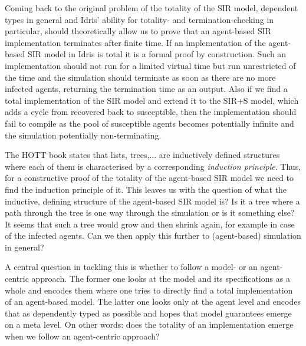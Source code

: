 Coming back to the original problem of the totality of the SIR model, dependent types in general and Idris' ability for totality- and termination-checking in particular, should theoretically allow us to prove that an agent-based SIR implementation terminates after finite time. If an implementation of the agent-based SIR model in Idris is total it is a formal proof by construction. Such an implementation should not run for a limited virtual time but run unrestricted of the time and the simulation should terminate as soon as there are no more infected agents, returning the termination time as an output. Also if we find a total implementation of the SIR model and extend it to the SIR+S model, which adds a cycle from recovered back to susceptible, then the implementation should fail to compile as the pool of susceptible agents becomes potentially infinite and the simulation potentially non-terminating.

The HOTT book \cite{program_homotopy_2013} states that lists, trees,... are inductively defined structures where each of them is characterised by a corresponding \textit{induction principle}. Thus, for a constructive proof of the totality of the agent-based SIR model we need to find the induction principle of it. This leaves us with the question of what the inductive, defining structure of the agent-based SIR model is? Is it a tree where a path through the tree is one way through the simulation or is it something else? It seems that such a tree would grow and then shrink again, for example in case of the infected agents. Can we then apply this further to (agent-based) simulation in general?

A central question in tackling this is whether to follow a model- or an agent-centric approach. The former one looks at the model and its specifications as a whole and encodes them where one tries to directly find a total implementation of an agent-based model. The latter one looks only at the agent level and encodes that as dependently typed as possible and hopes that model guarantees emerge on a meta level. On other words: does the totality of an implementation emerge when we follow an agent-centric approach? 


